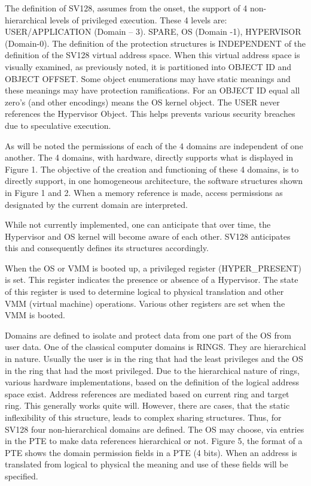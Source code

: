 \documentclass{article}
\begin{document}
The definition of SV128,  assumes from the onset,  the support of 4 non-hierarchical levels of privileged execution.  These 4 levels are:  USER/APPLICATION (Domain – 3).  SPARE,  OS (Domain -1), HYPERVISOR (Domain-0).   The definition of the protection structures is INDEPENDENT of the definition of the SV128 virtual address space.  When this virtual address space is visually examined,   as previously noted,  it is partitioned into OBJECT ID and OBJECT OFFSET. Some object enumerations may have static meanings and these meanings may have protection ramifications.  For an OBJECT ID equal all zero’s  (and other encodings) means the OS kernel object. The USER never references the Hypervisor Object. This helps  prevents various security breaches due to speculative execution. 

As will be noted the permissions of each of the 4 domains are independent of one another.  The 4 domains,  with hardware, directly supports  what is displayed in Figure 1. The objective of the creation and functioning of  these 4 domains,  is to directly support, in one homogeneous architecture, the software structures shown in Figure 1 and 2. When a memory reference is made,  access permissions as designated by the current domain are interpreted.  

While not currently implemented,  one can anticipate that over time,  the Hypervisor and OS kernel will become aware of each other.  SV128 anticipates this and consequently  defines its structures accordingly.

When the OS  or VMM is booted up,  a privileged register  (HYPER\_PRESENT) is set.  This register indicates the presence or absence of a Hypervisor.    The state of this register is used to determine logical to physical translation and other  VMM (virtual machine) operations. Various other registers are set when the VMM is booted.

Domains are defined to isolate and protect data from one part of the OS from user data.  One of the classical computer domains is RINGS.  They are hierarchical in nature.  Usually the user is in the ring that had the least privileges and the OS in the ring that had the most privileged.  Due to the hierarchical nature of rings,  various hardware implementations,  based on the definition of the logical address space exist.  Address references are mediated based on current   ring and target ring. This generally works quite will.  However, there are cases,  that the static inflexibility of this structure, leads to complex sharing structures.   Thus, for SV128 four non-hierarchical domains are defined. The OS may choose, via entries in the PTE to make data references hierarchical or not. Figure 5,  the format of a PTE shows the domain  permission fields in a PTE (4 bits).  When an address is translated from logical to physical the meaning and use of these fields will be specified.
\end{document}

